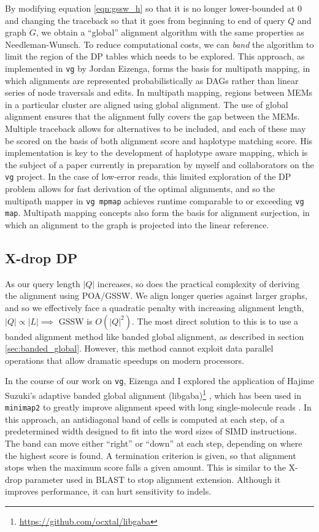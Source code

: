 By modifying equation \ref{eqn:gssw_h} so that it is no longer lower-bounded at 0 and changing the traceback so that it goes from beginning to end of query $Q$ and graph $G$, we obtain a ``global'' alignment algorithm with the same properties as Needleman-Wunsch.
To reduce computational costs, we can \emph{band} the algorithm to limit the region of the DP tables which needs to be explored.
This approach, as implemented in {\tt vg} by Jordan Eizenga, forms the basis for multipath mapping, in which alignments are represented probabilistically as DAGs rather than linear series of node traversals and edits.
In multipath mapping, regions between MEMs in a particular cluster are aligned using global alignment.
The use of global alignment ensures that the alignment fully covers the gap between the MEMs.
Multiple traceback allows for alternatives to be included, and each of these may be scored on the basis of both alignment score and haplotype matching score.
His implementation is key to the development of haplotype aware mapping, which is the subject of a paper currently in preparation by myself and collaborators on the {\tt vg} project.
In the case of low-error reads, this limited exploration of the DP problem allows for fast derivation of the optimal alignments, and so the multipath mapper in {\tt vg mpmap} achieves runtime comparable to or exceeding {\tt vg map}.
Multipath mapping concepts also form the basis for alignment surjection, in which an alignment to the graph is projected into the linear reference.

\subsection{X-drop DP}

As our query length $|Q|$ increases, so does the practical complexity of deriving the alignment using POA/GSSW.
We align longer queries against larger graphs, and so we effectively face a quadratic penalty with increasing alignment length, $|Q| \propto |L| \implies$ GSSW is $O(|Q|^2)$.
The most direct solution to this is to use a banded alignment method like banded global alignment, as described in section \ref{sec:banded_global}.
However, this method cannot exploit data parallel operations that allow dramatic speedups on modern processors.

In the course of our work on {\tt vg}, Eizenga and I explored the application of Hajime Suzuki's adaptive banded global alignment (libgaba)\footnote{\url{https://github.com/ocxtal/libgaba}} \cite{suzuki2017acceleration}, which has been used in {\tt minimap2} to greatly improve alignment speed with long single-molecule reads \cite{li2018minimap2}.
In this approach, an antidiagonal band of cells is computed at each step, of a predetermined width designed to fit into the word sizes of SIMD instructions.
The band can move either ``right'' or ``down'' at each step, depending on where the highest score is found.
A termination criterion is given, so that alignment stops when the maximum score falls a given amount.
This is similar to the X-drop parameter used in BLAST to stop alignment extension.
Although it improves performance, it can hurt sensitivity to indels.


